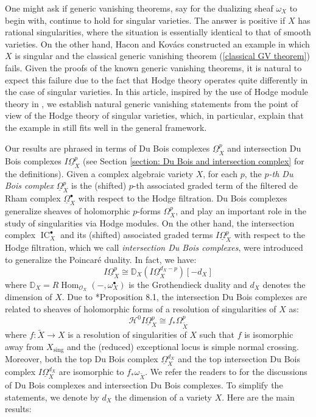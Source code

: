 \documentclass[11pt]{amsart}
\theoremstyle{definition}
\theoremstyle{plain}
\renewcommand{\H}{\mathcal H}
\renewcommand{\O}{\mathcal O}
\newcommand{\DD}{\mathbb D}
\DeclareMathOperator{\Hom}{Hom}
\newcommand{\DB}{\underline{\Omega}} %
\DeclareMathOperator{\sing}{sing}
\DeclareMathOperator{\IC}{IC}
\newcommand{\Poincare}{Poincar\'{e}}
\newcommand{\Kovacs}{Kov\'acs}
\newcounter{intro}
\begin{document}
One might ask if generic vanishing theorems, say for the dualizing sheaf $\omega_X$ to begin with, continue to hold for singular varieties. The answer is positive if $X$ has rational singularities, where the situation is essentially identical to that of smooth varieties. On the other hand, Hacon and \Kovacs{} \cite[Theorem 1.3]{Hacon-counter_eg_for_GV} constructed an example in which $X$ is singular and the classical generic vanishing theorem (\ref{classical GV theorem}) fails. Given the proofs of the known generic vanishing theorems, it is natural to expect this failure due to the fact that Hodge theory operates quite differently in the case of singular varieties.  
In this article, inspired by the use of Hodge module theory in \cite{PS_generic_vanishing}, we establish natural generic vanishing statements from the point of view of the Hodge theory of singular varieties, which, in particular, explain that the example in \cite{Hacon-counter_eg_for_GV} still fits well in the general framework. 

Our results are phrased in terms of Du Bois complexes $\DB_X^p$ and intersection Du Bois complexes $I\DB_X^p$ (see Section \ref{section: Du Bois and intersection complex} for the definitions). Given a complex algebraic variety $X$, for each $p$, the \textit{$p$-th Du Bois complex} $\DB_X^p$ is the (shifted) $p$-th associated graded term of the filtered de Rham complex $\DB_X^\bullet$ with respect to the Hodge filtration. Du Bois complexes generalize sheaves of holomorphic $p$-forms $\Omega_X^p$, and play an important role in the study of singularities via Hodge modules. On the other hand, the intersection complex $\IC_X^\bullet$ and its (shifted) associated graded terms $I\DB_X^p$ with respect to the Hodge filtration, which we call \textit{intersection Du Bois complexes}, were introduced to generalize the \Poincare{} duality. In fact, we have: 
\[I\DB_X^p \cong \DD_X(I\DB_X^{d_X-p})[-d_X]\]
where $\DD_X = R\Hom_{\O_X}(-,\omega_X^\bullet)$ is the Grothendieck duality and $d_X$ denotes the dimension of $X$. Due to \cite{Kebekus-Schnell}*{Proposition 8.1}, the intersection Du Bois complexes are related to sheaves of holomorphic forms of a resolution of singularities of $X$ as:
\[\H^0 I\DB_X^p \cong f_* \Omega_{\tilde X}^p\]
where $f: \tilde X \to X$ is a resolution of singularities of $X$ such that $f$ is isomorphic away from $X_{\sing}$ and the (reduced) exceptional locus is simple normal crossing. Moreover, both the top Du Bois complex $\DB_X^{d_X}$ and the top intersection Du Bois complex $I\DB_X^{d_X}$ are isomorphic to $f_* \omega_{\tilde X}$.  
We refer the readers to \cite{Mihnea-Sunggi} for the discussions of Du Bois complexes and intersection Du Bois complexes. To simplify the statements, we denote by $d_X$ the dimension of a variety $X$. Here are the main results:
\end{document}
